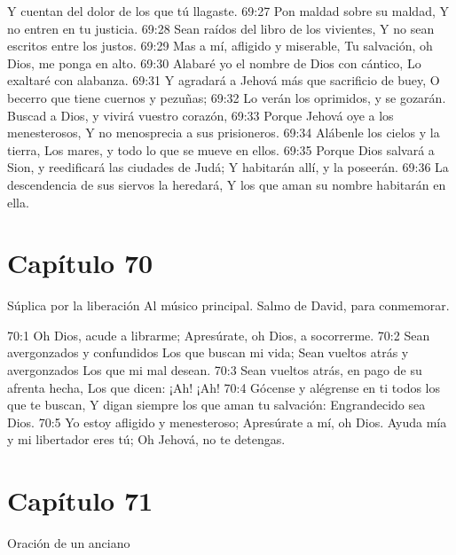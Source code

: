 Y cuentan del dolor de los que tú llagaste. 
69:27 Pon maldad sobre su maldad, 
Y no entren en tu justicia. 
69:28 Sean raídos del libro de los vivientes, 
Y no sean escritos entre los justos. 
69:29 Mas a mí, afligido y miserable, 
Tu salvación, oh Dios, me ponga en alto. 
69:30 Alabaré yo el nombre de Dios con cántico, 
Lo exaltaré con alabanza. 
69:31 Y agradará a Jehová más que sacrificio de buey, 
O becerro que tiene cuernos y pezuñas; 
69:32 Lo verán los oprimidos, y se gozarán. 
Buscad a Dios, y vivirá vuestro corazón, 
69:33 Porque Jehová oye a los menesterosos, 
Y no menosprecia a sus prisioneros. 
69:34 Alábenle los cielos y la tierra, 
Los mares, y todo lo que se mueve en ellos. 
69:35 Porque Dios salvará a Sion, y reedificará las ciudades de Judá; 
Y habitarán allí, y la poseerán. 
69:36 La descendencia de sus siervos la heredará, 
Y los que aman su nombre habitarán en ella. 
\section*{Capítulo 70}
Súplica por la liberación 
Al músico principal. Salmo de David, para conmemorar. 
 
70:1 Oh Dios, acude a librarme; 
Apresúrate, oh Dios, a socorrerme. 
70:2 Sean avergonzados y confundidos 
Los que buscan mi vida; 
Sean vueltos atrás y avergonzados 
Los que mi mal desean. 
70:3 Sean vueltos atrás, en pago de su afrenta hecha, 
Los que dicen: ¡Ah! ¡Ah! 
70:4 Gócense y alégrense en ti todos los que te buscan, 
Y digan siempre los que aman tu salvación: 
Engrandecido sea Dios. 
70:5 Yo estoy afligido y menesteroso; 
Apresúrate a mí, oh Dios. 
Ayuda mía y mi libertador eres tú; 
Oh Jehová, no te detengas. 
\section*{Capítulo 71}
Oración de un anciano 
 
